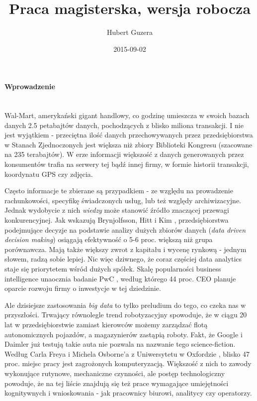 \documentclass{article}
\title{Praca magisterska, wersja robocza}
\date{2015-09-02}
\author{Hubert Guzera}
\begin{document}
\maketitle




\paragraph{Wprowadzenie} \mbox{}\\

Wal-Mart, amerykański gigant handlowy, co godzinę umieszcza w swoich bazach danych 2.5 petabajtów danych, pochodzących z blisko miliona transakcji. I nie jest wyjątkiem - przeciętna ilość danych przechowywanych przez przedsiębiorstwa w Stanach Zjednoczonych jest większa niż zbiory Biblioteki Kongresu (szacowane na 235 terabajtów). W erze informacji większość z danych generowanych przez konsumentów trafia na serwery tej bądź innej firmy, w formie historii transakcji, koordynatu GPS czy zdjęcia. 

Często informacje te zbierane są przypadkiem - ze względu na prowadzenie rachunkowości, specyfikę świadczonych usług, lub też względy archiwizacyjne. Jednak wydobycie z nich \textit{wiedzy} może stanowić źródło znaczącej przewagi konkurencyjnej.  Jak wskazują Brynjolfsson, Hitt i Kim \cite{Brynjolfsson2011}, przedsiębiorstwa podejmujące decyzje na podstawie analizy dużych zbiorów danych (\textit{data driven decision making}) osiągają efektywność o 5-6 proc. większą niż grupa porównawcza. Mają także większy zwrot z kapitału i wycenę rynkową - jednym słowem, radzą sobie lepiej. Nic więc dziwnego, że coraz częściej data analytics staje się priorytetem wśród dużych spółek. Skalę popularności business intelligence unaocznia badanie PwC \cite{PwC2014}, według którego 44 proc. CEO planuje oparcie rozwoju firmy o inwestycje w tej dziedzinie. 

Ale dzisiejsze zastosowania \textit{big data} to tylko preludium do tego, co czeka nas w przyszłości. Trwający równolegle trend robotyzacyjny spowoduje, że w ciągu 20 lat w przedsiębiorstwie zamiast kierowców możemy zarządzać flotą autonomicznych pojazdów, a magazynierów zastąpią roboty. Fakt, że Google i Daimler już testują takie auta nie pozwala na nazwanie tego science-fiction. Według Carla Freya i Michela Osborne'a z Uniwersytetu w Oxfordzie \cite{Frey2013}, blisko 47 proc. miejsc pracy jest zagrożonych komputeryzacją. Większość z nich to zawody wykonujące rutynowe, mechaniczne czynności, ale postęp technologiczny powoduje, że na tej liście znajdują się też prace wymagające umiejętności kognitywnych i wnioskowania - jak pracownicy biurowi, analitycy czy operatorzy. 
\end{document}
